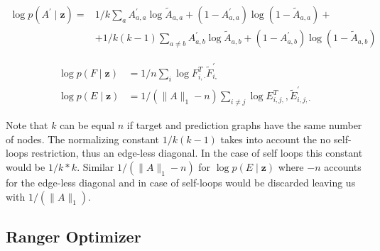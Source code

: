 {{\begin{equation}
    \begin{split}
        \log p\left(A^{\prime} \mid \mathbf{z}\right) = &1 / k \sum_{a} A_{a, a}^{\prime} \log \widetilde{A}_{a, a}+\left(1-A_{a, a}^{\prime}\right) \log \left(1-\widetilde{A}_{a, a}\right)+ \\ & +1 / k(k-1) \sum_{a \neq b} A_{a, b}^{\prime} \log \widetilde{A}_{a, b}+\left(1-A_{a, b}^{\prime}\right) \log \left(1-\widetilde{A}_{a, b}\right)
    \end{split}
    \label{eq3:GAVElossA}
\end{equation}

\begin{align}
    \log p(F \mid \mathbf{z}) &=1 / n \sum_{i} \log F_{i, \cdot}^{T} \widetilde{F}_{i,}^{\prime} \\
    \log p(E \mid \mathbf{z}) &=1 /\left(\|A\|_{1}-n\right) \sum_{i \neq j} \log E_{i, j,}^{T}, \widetilde{E}_{i, j, \cdot}^{\prime}
    \label{eq3:GAVElossEF}
\end{align}

Note that $k$ can be equal $n$ if target and prediction graphs have the same number of nodes. The normalizing constant $1 / k(k-1)$ takes into account the no self-loops restriction, thus an edge-less diagonal. In the case of self loops this constant would be $1 / k*k$. Similar $1 /\left(\|A\|_{1}-n\right)$ for $\log p(E \mid \mathbf{z})$ where $-n$ accounts for the edge-less diagonal and in case of self-loops would be discarded leaving us with $1 /\left(\|A\|_{1}\right)$.

\subsection{Ranger Optimizer}
\label{sec3:ranger}

}}
